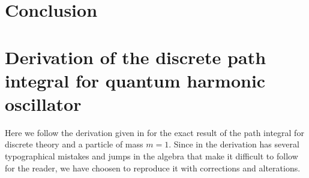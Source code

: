 \documentclass[12pt]{article}
\begin{document}
\section{Conclusion}






\appendix

\section{Derivation of the discrete path integral for quantum harmonic oscillator}
Here we follow the derivation given in \cite{creutz_freedman_1981} for the exact result of the path integral for discrete theory and a particle of mass $m=1$. Since in \cite{creutz_freedman_1981} the derivation has several typographical mistakes and jumps in the algebra that make it difficult to follow for the reader, we have choosen to reproduce it with corrections and alterations.
\end{document}
